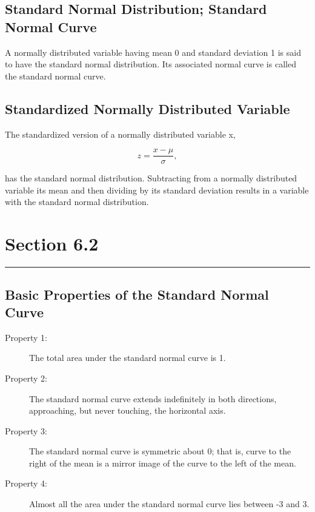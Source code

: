 \documentclass[12pt]{article}
\begin{document}
        \subsection*{Standard Normal Distribution; Standard Normal Curve}
            A normally distributed variable having mean 0 and standard deviation 1 is said to
            have the standard normal distribution. Its associated normal curve is called the
            standard normal curve.
        \subsection*{Standardized Normally Distributed Variable}
            The standardized version of a normally distributed variable x,
            \begin{center}
                \[
                    z = \frac{x - \mu}{\sigma}, 
                \]
            \end{center}
            has the standard normal distribution. Subtracting from a normally distributed variable
            its mean and then dividing by its standard deviation results in a variable with the
            standard normal distribution.

    \section[]{Section 6.2}
    \noindent\rule{\textwidth}{0.4pt}
        \subsection*{Basic Properties of the Standard Normal Curve}
            \begin{description}
                \item[Property 1:] The total area under the standard normal curve is 1.
                \item[Property 2:] The standard normal curve extends indefinitely in both
                directions, approaching, but never touching, the horizontal axis.                 
                \item[Property 3:] The standard normal curve is symmetric about 0; that is, curve
                to the right of the mean is a mirror image of the curve to the left of the mean.
                \item[Property 4:] Almost all the area under the standard normal curve lies between
                -3 and 3.  
            \end{description}
\end{document}
